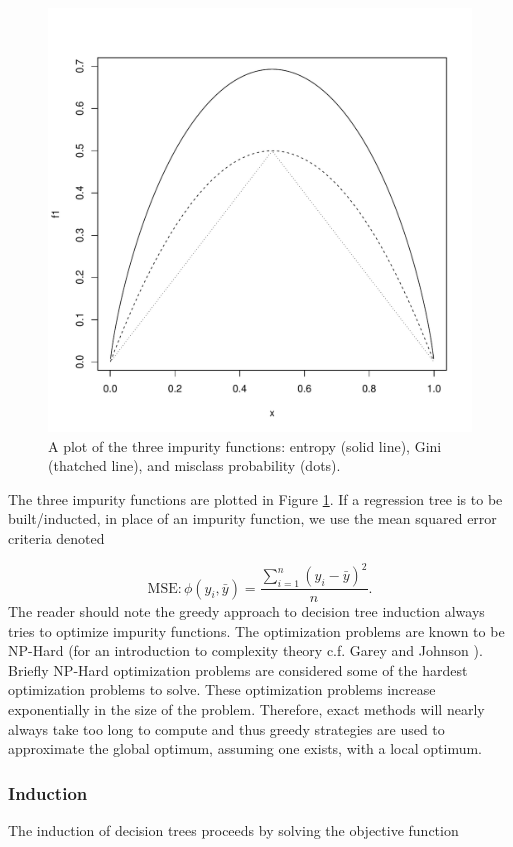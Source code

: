 \begin{figure}[H]
  \centering
  \includegraphics[scale=.7]{figures/impurity_plot.pdf}
  \caption{A plot of the three impurity functions: entropy (solid line), Gini (thatched line), and misclass probability (dots).  }
  \label{fig:impurity}
\end{figure}

The three impurity functions are plotted in Figure \ref{fig:impurity}. If a regression tree is to be built/inducted, in place of an impurity function, we use the mean squared error criteria denoted

$$\text{MSE}: \phi(y_i, \bar{y})=\frac{\sum_{i=1}^n(y_i-\bar{y})^2}{n}.$$
The reader should note the greedy approach to decision tree induction always tries to optimize impurity functions. The optimization problems are known to be NP-Hard (for an introduction to complexity theory c.f. Garey and Johnson \cite{garey1979computers}). Briefly NP-Hard optimization problems are considered some of the hardest optimization problems to solve. These optimization problems increase exponentially in the size of the problem. Therefore, exact methods will nearly always take too long to compute and thus greedy strategies are used to approximate the global optimum, assuming one exists, with a local optimum. 
\subsubsection{Induction}
The induction of decision trees proceeds by solving the objective function

